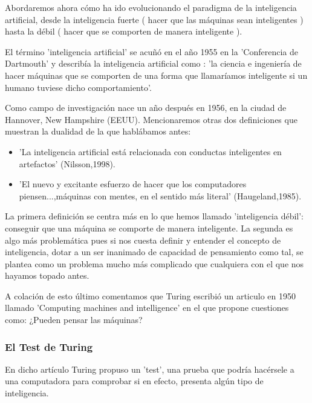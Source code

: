 Abordaremos ahora cómo ha ido evolucionando el paradigma de la inteligencia artificial, desde la inteligencia fuerte ( hacer que las máquinas sean inteligentes ) hasta la débil ( hacer que se comporten de manera inteligente ).

\vspace{10px}


El término 'inteligencia artificial' se acuñó en el año 1955 en la 'Conferencia de Dartmouth' y describía la inteligencia artificial como : 'la ciencia e ingeniería de hacer máquinas que se comporten de una forma que llamaríamos inteligente si un humano tuviese dicho comportamiento'.

\vspace{10px} 

Como campo de investigación nace un año después en 1956, en la ciudad de Hannover, New Hampshire (EEUU). Mencionaremos otras dos definiciones que muestran la dualidad de la que hablábamos antes:

\begin{itemize}
	\item 'La inteligencia artificial está relacionada con conductas inteligentes en artefactos' (Nilsson,1998).
	\item 'El nuevo y excitante esfuerzo de hacer que los computadores piensen...,máquinas con mentes, en el sentido más literal' (Haugeland,1985).
\end{itemize}

La primera definición se centra más en lo que hemos llamado 'inteligencia débil': conseguir que una máquina se comporte de manera inteligente. La segunda es algo más problemática pues si nos cuesta definir y entender el concepto de inteligencia, dotar a un ser inanimado de capacidad de pensamiento como tal, se plantea como un problema mucho más complicado que cualquiera con el que nos hayamos topado antes.

\vspace{10px}

A colación de esto último comentamos que Turing escribió un articulo en 1950 llamado 'Computing machines and intelligence' en el que propone cuestiones como: ¿Pueden pensar las máquinas?


\subsubsection{El Test de Turing}

En dicho artículo Turing propuso un 'test', una prueba que podría hacérsele a una computadora para comprobar si en efecto, presenta algún tipo de inteligencia.

